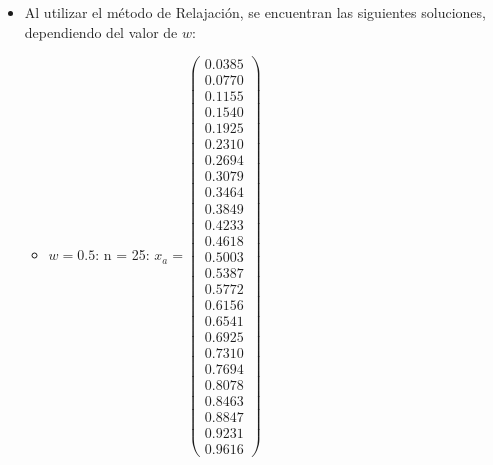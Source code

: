 \documentclass{udpreport}
\begin{document}
\begin{enumerate}
\begin{enumerate}
{{{{\begin{itemize}
				\item Al utilizar el método de Relajación, se encuentran las siguientes soluciones, dependiendo del valor de $w$:
				\begin{itemize}
				\item $w = 0.5$:
				n = 25: $x_{a} = \left(\begin{array}{c} 0.0385\\ 0.0770\\ 0.1155\\ 0.1540\\ 0.1925\\ 0.2310\\ 0.2694\\ 0.3079\\ 0.3464\\ 0.3849\\ 0.4233\\ 0.4618\\ 0.5003\\ 0.5387\\ 0.5772\\ 0.6156\\ 0.6541\\ 0.6925\\ 0.7310\\ 0.7694\\ 0.8078\\ 0.8463\\ 0.8847\\ 0.9231\\ 0.9616 \end{array}\right)$
				

\end{itemize}
\end{itemize}}}}}
\end{enumerate}
\end{enumerate}
\end{document}
